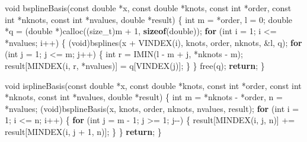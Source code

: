 \documentclass[
  12pt,
]{book}
\newenvironment{Shaded}{\begin{snugshade}}{\end{snugshade}}
\newcommand{\ControlFlowTok}[1]{\textcolor[rgb]{0.13,0.29,0.53}{\textbf{#1}}}
\newcommand{\DataTypeTok}[1]{\textcolor[rgb]{0.13,0.29,0.53}{#1}}
\newcommand{\DecValTok}[1]{\textcolor[rgb]{0.00,0.00,0.81}{#1}}
\newcommand{\KeywordTok}[1]{\textcolor[rgb]{0.13,0.29,0.53}{\textbf{#1}}}
\newcommand{\NormalTok}[1]{#1}
\theoremstyle{definition}
\theoremstyle{definition}
\theoremstyle{definition}
\theoremstyle{definition}
\theoremstyle{remark}
\begin{document}
\begin{Shaded}
\begin{Highlighting}[]
\DataTypeTok{void}\NormalTok{ bsplineBasis(}\DataTypeTok{const} \DataTypeTok{double}\NormalTok{ *x, }\DataTypeTok{const} \DataTypeTok{double}\NormalTok{ *knots, }\DataTypeTok{const} \DataTypeTok{int}\NormalTok{ *order,}
                  \DataTypeTok{const} \DataTypeTok{int}\NormalTok{ *nknots, }\DataTypeTok{const} \DataTypeTok{int}\NormalTok{ *nvalues, }\DataTypeTok{double}\NormalTok{ *result) \{}
    \DataTypeTok{int}\NormalTok{ m = *order, l = }\DecValTok{0}\NormalTok{;}
    \DataTypeTok{double}\NormalTok{ *q = (}\DataTypeTok{double}\NormalTok{ *)calloc((}\DataTypeTok{size\_t}\NormalTok{)m + }\DecValTok{1}\NormalTok{, }\KeywordTok{sizeof}\NormalTok{(}\DataTypeTok{double}\NormalTok{));}
    \ControlFlowTok{for}\NormalTok{ (}\DataTypeTok{int}\NormalTok{ i = }\DecValTok{1}\NormalTok{; i \textless{}= *nvalues; i++) \{}
\NormalTok{        (}\DataTypeTok{void}\NormalTok{)bsplines(x + VINDEX(i), knots, order, nknots, \&l, q);}
        \ControlFlowTok{for}\NormalTok{ (}\DataTypeTok{int}\NormalTok{ j = }\DecValTok{1}\NormalTok{; j \textless{}= m; j++) \{}
            \DataTypeTok{int}\NormalTok{ r = IMIN(l {-} m + j, *nknots {-} m);}
\NormalTok{            result[MINDEX(i, r, *nvalues)] = q[VINDEX(j)];}
\NormalTok{        \}}
\NormalTok{    \}}
\NormalTok{    free(q);}
    \ControlFlowTok{return}\NormalTok{;}
\NormalTok{\}}

\DataTypeTok{void}\NormalTok{ isplineBasis(}\DataTypeTok{const} \DataTypeTok{double}\NormalTok{ *x, }\DataTypeTok{const} \DataTypeTok{double}\NormalTok{ *knots, }\DataTypeTok{const} \DataTypeTok{int}\NormalTok{ *order,}
                  \DataTypeTok{const} \DataTypeTok{int}\NormalTok{ *nknots, }\DataTypeTok{const} \DataTypeTok{int}\NormalTok{ *nvalues, }\DataTypeTok{double}\NormalTok{ *result) \{}
    \DataTypeTok{int}\NormalTok{ m = *nknots {-} *order, n = *nvalues;}
\NormalTok{    (}\DataTypeTok{void}\NormalTok{)bsplineBasis(x, knots, order, nknots, nvalues, result);}
    \ControlFlowTok{for}\NormalTok{ (}\DataTypeTok{int}\NormalTok{ i = }\DecValTok{1}\NormalTok{; i \textless{}= n; i++) \{}
        \ControlFlowTok{for}\NormalTok{ (}\DataTypeTok{int}\NormalTok{ j = m {-} }\DecValTok{1}\NormalTok{; j \textgreater{}= }\DecValTok{1}\NormalTok{; j{-}{-}) \{}
\NormalTok{            result[MINDEX(i, j, n)] += result[MINDEX(i, j + }\DecValTok{1}\NormalTok{, n)];}
\NormalTok{        \}}
\NormalTok{    \}}
    \ControlFlowTok{return}\NormalTok{;}
\NormalTok{\}}


\end{Highlighting}
\end{Shaded}
\end{document}
